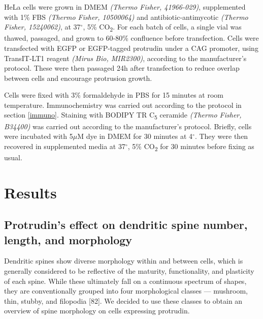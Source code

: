 \documentclass[
  12pt,
  a4paper,
]{book}
\begin{document}
HeLa cells were grown in DMEM \emph{(Thermo Fisher, 41966-029)}, supplemented with 1\% FBS \emph{(Thermo Fisher, 10500064)} and antibiotic-antimycotic \emph{(Thermo Fisher, 15240062)}, at 37\(^{\circ}\), 5\% CO\textsubscript{2}. For each batch of cells, a single vial was thawed, passaged, and grown to 60-80\% confluence before transfection. Cells were transfected with EGFP or EGFP-tagged protrudin under a CAG promoter, using TransIT-LT1 reagent \emph{(Mirus Bio, MIR2300)}, according to the manufacturer's protocol. These were then passaged 24h after transfection to reduce overlap between cells and encourage protrusion growth.

Cells were fixed with 3\% formaldehyde in PBS for 15 minutes at room temperature. Immunochemistry was carried out according to the protocol in section \ref{immuno}. Staining with BODIPY TR C\textsubscript{5} ceramide \emph{(Thermo Fisher, B34400)} was carried out according to the manufacturer's protocol. Briefly, cells were incubated with 5\(\mu\)M dye in DMEM for 30 minutes at 4\(^{\circ}\). They were then recovered in supplemented media at 37\(^{\circ}\), 5\% CO\textsubscript{2} for 30 minutes before fixing as usual.

\hypertarget{results-1}{%
\section{Results}\label{results-1}}

\hypertarget{protrudins-effect-on-dendritic-spine-number-length-and-morphology}{%
\subsection{Protrudin's effect on dendritic spine number, length, and morphology}\label{protrudins-effect-on-dendritic-spine-number-length-and-morphology}}

Dendritic spines show diverse morphology within and between cells, which is generally considered to be reflective of the maturity, functionality, and plasticity of each spine. While these ultimately fall on a continuous spectrum of shapes, they are conventionally grouped into four morphological classes --- mushroom, thin, stubby, and filopodia {[}82{]}. We decided to use these classes to obtain an overview of spine morphology on cells expressing protrudin.
\end{document}
